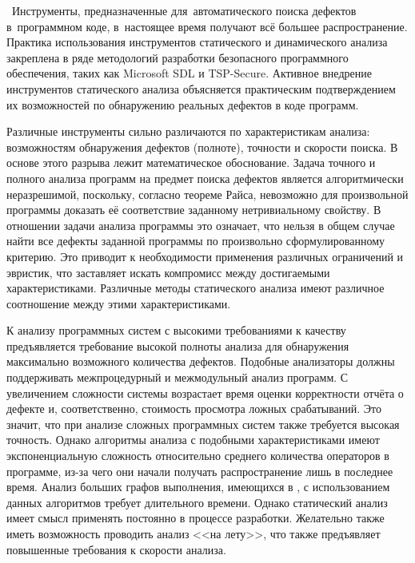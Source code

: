 \actuality\
Инструменты, предназначенные для~автоматического поиска дефектов в~программном коде, в~настоящее время получают всё большее распространение. Практика использования инструментов статического и динамического анализа закреплена в ряде методологий разработки безопасного программного обеспечения, таких как Microsoft SDL и TSP-Secure. Активное внедрение инструментов статического анализа объясняется практическим подтверждением их возможностей по обнаружению реальных дефектов в коде программ. 

Различные инструменты сильно различаются по характеристикам анализа: возможностям обнаружения дефектов (полноте), точности и скорости поиска. В основе этого разрыва лежит математическое обоснование. Задача точного и полного анализа программ на предмет поиска дефектов является алгоритмически неразрешимой, поскольку, согласно теореме Райса, невозможно для произвольной программы доказать её соответствие заданному нетривиальному свойству. В отношении задачи анализа программы это означает, что нельзя в общем случае найти все дефекты заданной программы по произвольно сформулированному критерию. Это приводит к необходимости применения различных ограничений и эвристик, что заставляет искать компромисс между достигаемыми характеристиками. Различные методы статического анализа имеют различное соотношение между этими характеристиками. %


К анализу программных систем с высокими требованиями к качеству предъявляется требование высокой полноты анализа для обнаружения максимально возможного количества дефектов. Подобные анализаторы должны поддерживать межпроцедурный и межмодульный анализ программ. С увеличением сложности системы возрастает время оценки корректности отчёта о дефекте и, соответственно, стоимость просмотра ложных срабатываний. Это значит, что при анализе сложных программных систем также требуется высокая точность. Однако алгоритмы анализа с подобными характеристиками имеют экспоненциальную сложность относительно среднего количества операторов в программе, из-за чего они начали получать распространение лишь в последнее время. Анализ больших графов выполнения, имеющихся в , с использованием данных алгоритмов требует длительного времени. Однако статический анализ имеет смысл применять постоянно в процессе разработки. Желательно также иметь возможность проводить анализ <<на лету>>, что также предъявляет повышенные требования к скорости анализа.

